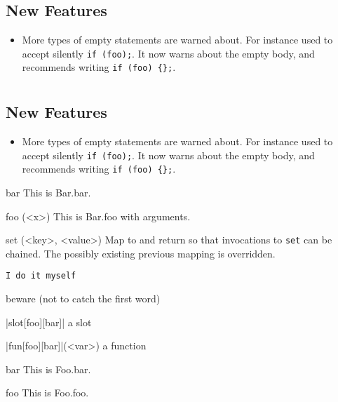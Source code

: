 \documentclass[openright,twoside,11pt]{book}
\begin{document}
\subsection{New Features}
\begin{itemize}
\item More types of empty statements are warned about.  For instance \urbi
  used to accept silently \lstinline|if (foo);|.  It now warns about the empty
  body, and recommends writing \lstinline|if (foo) {};|.
\end{itemize}

\section{}

\subsection{New Features}
\begin{itemize}
\item More types of empty statements are warned about.  For instance \urbi
  used to accept silently \lstinline|if (foo);|.  It now warns about the empty
  body, and recommends writing \lstinline|if (foo) {};|.
\end{itemize}



\begin{urbiscriptapi}
\item[bar] This is Bar.bar.
\item[foo](<x>) This is Bar.foo with arguments.
\item[set](<key>, <value>) Map  to  and return \this so
  that invocations to \lstinline|set| can be chained.  The possibly existing
  previous mapping is overridden.
\item \lstinline|I do it myself|
\item beware (not to catch the first word)
\item|slot[foo][bar]| a slot
\item|fun[foo][bar]|(<var>) a function
\end{urbiscriptapi}


\begin{urbiscriptapi}
\item[bar] This is Foo.bar.
\item[foo] This is Foo.foo.
\end{urbiscriptapi}
\end{document}
